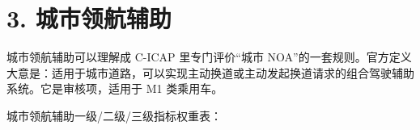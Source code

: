 \section{3. 城市领航辅助}

城市领航辅助可以理解成 C-ICAP 里专门评价“城市 NOA”的一套规则。官方定义大意是：适用于城市道路，可以实现主动换道或主动发起换道请求的组合驾驶辅助系统。它是审核项，适用于 M1 类乘用车。

城市领航辅助一级/二级/三级指标权重表：

